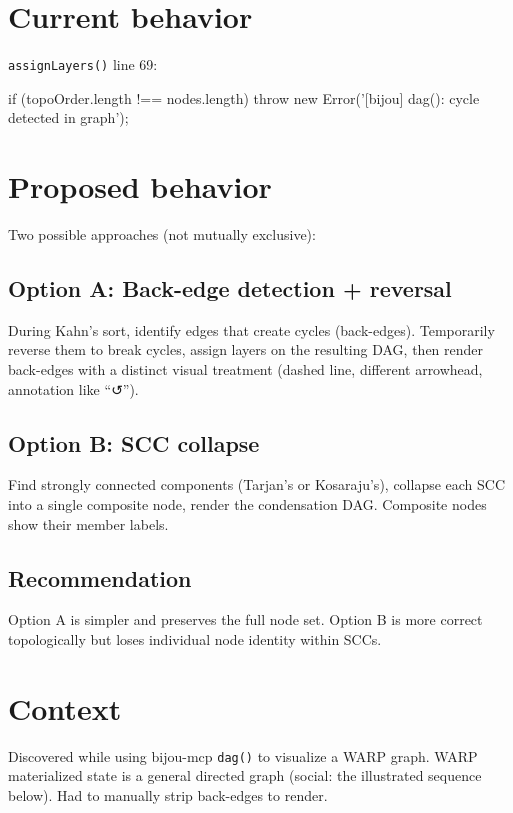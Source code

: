 \section{Current behavior}\label{record-401-current-behavior}

\texttt{a\allowbreak{}s\allowbreak{}s\allowbreak{}i\allowbreak{}g\allowbreak{}n\allowbreak{}L\allowbreak{}a\allowbreak{}y\allowbreak{}e\allowbreak{}r\allowbreak{}s\allowbreak{}(\allowbreak{})} line 69:

\begin{CodeBlock}
if (topoOrder.length !== nodes.length) {
  throw new Error('[bijou] dag(): cycle detected in graph');
}
\end{CodeBlock}

\section{Proposed behavior}\label{record-401-proposed-behavior}

Two possible approaches (not mutually exclusive):

\subsection{Option A: Back-edge detection + reversal}\label{record-401-option-a-back-edge-detection-reversal}

During Kahn's sort, identify edges that create cycles (back-edges). Temporarily reverse them to break cycles, assign layers on the resulting DAG, then render back-edges with a distinct visual treatment (dashed line, different arrowhead, annotation like ``↺'').

\subsection{Option B: SCC collapse}\label{record-401-option-b-scc-collapse}

Find strongly connected components (Tarjan's or Kosaraju's), collapse each SCC into a single composite node, render the condensation DAG. Composite nodes show their member labels.

\subsection{Recommendation}\label{record-401-recommendation}

Option A is simpler and preserves the full node set. Option B is more correct topologically but loses individual node identity within SCCs.

\section{Context}\label{record-401-context}

Discovered while using bijou-mcp \texttt{d\allowbreak{}a\allowbreak{}g\allowbreak{}(\allowbreak{})} to visualize a WARP graph. WARP materialized state is a general directed graph (social: the illustrated sequence below). Had to manually strip back-edges to render.



